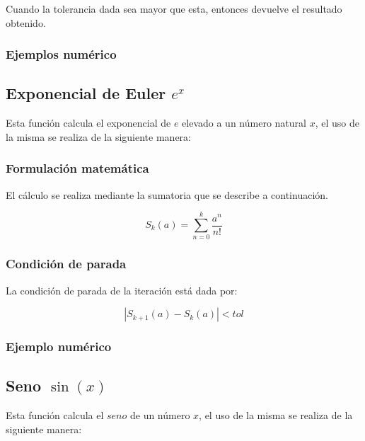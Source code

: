 \documentclass[10pt,a4paper]{article}
\begin{document}
	Cuando la tolerancia dada sea mayor que esta, entonces devuelve el resultado obtenido.
	
	\subsubsection{Ejemplos numérico}
	
	\subsection{Exponencial de Euler $e^{x}$}
	
	Esta función calcula el exponencial de $e$ elevado a un número natural $x$, el uso de la misma se realiza de la siguiente manera:
	
	\begin{center}
	\end{center}
	
	\subsubsection{Formulación matemática}
	
	El cálculo se realiza mediante la sumatoria que se describe a continuación.
	
	\begin{equation}\label{key4}
		S_{k}(a) = \sum_{n=0}^{k}\frac{a^{n}}{n!}
	\end{equation}
	
	\subsubsection{Condición de parada}
	
	La condición de parada de la iteración está dada por: 
	
	\begin{equation}\label{key5}
		\left\lvert S_{k+1}(a) - S_{k}(a) \right\lvert < tol
	\end{equation}
	
	\subsubsection{Ejemplo numérico}

	\subsection{Seno $\sin(x)$}
	
	Esta función calcula el $seno$ de un número $x$, el uso de la misma se realiza de la siguiente manera:
	
\end{document}
